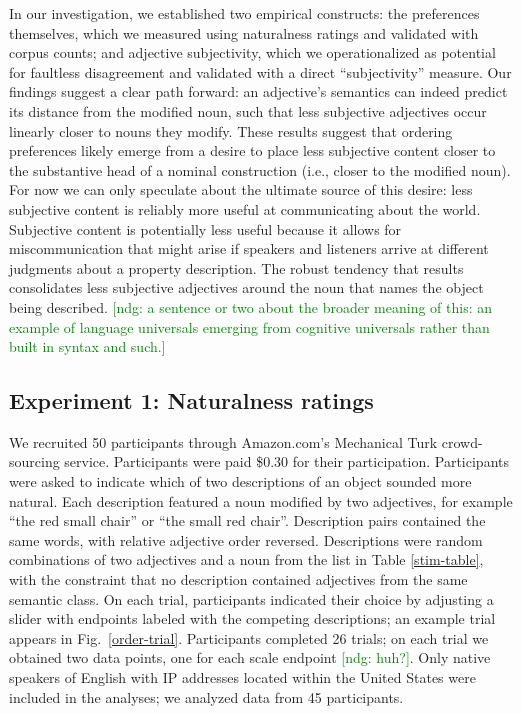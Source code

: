 \documentclass{pnastwo}
\newcommand{\ndg}[1]{\textcolor{Green}{[ndg: #1]}}
\begin{document}
\begin{article}
In our investigation, we established two empirical constructs: the preferences themselves, which we measured using naturalness ratings and validated with corpus counts; and adjective subjectivity, which we operationalized as potential for faultless disagreement and validated with a direct ``subjectivity'' measure. Our findings suggest a clear path forward: an adjective's semantics can indeed predict its distance from the modified noun, such that less subjective adjectives occur linearly closer to nouns they modify. These results suggest that ordering preferences likely emerge from a desire to place less subjective content closer to the substantive head of a nominal construction (i.e., closer to the modified noun). For now we can only speculate about the ultimate source of this desire: less subjective content is reliably more useful at communicating about the world. Subjective content is potentially less useful because it allows for miscommunication that might arise if speakers and listeners arrive at different judgments about a property description. The robust tendency that results consolidates less subjective adjectives around the noun that names the object being described.
\ndg{a sentence or two about the broader meaning of this: an example of language universals emerging from cognitive universals rather than built in syntax and such.}

\begin{materials}
\section{Experiment 1: Naturalness ratings}	
We recruited 50 participants through Amazon.com's Mechanical Turk crowd-sourcing service. Participants were paid \$0.30 for their participation.
Participants were asked to indicate which of two descriptions of an object sounded more natural. Each description featured a noun modified by two adjectives, for example ``the red small chair'' or ``the small red chair''. Description pairs contained the same words, with relative adjective order reversed. Descriptions were random combinations of two adjectives and a noun from the list in Table \ref{stim-table}, with the constraint that no description contained adjectives from the same semantic class.
On each trial, participants indicated their choice by adjusting a slider with endpoints labeled with the competing descriptions; an example trial appears in Fig.\ \ref{order-trial}. Participants completed 26 trials; on each trial we obtained two data points, one for each scale endpoint \ndg{huh?}.  Only native speakers of English with IP addresses located within the United States were included in the analyses; we analyzed data from 45 participants.


\end{materials}
\end{article}
\end{document}
